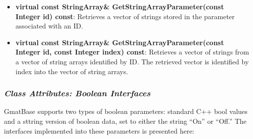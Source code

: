 \begin{itemize}
{Integer index) const}: Retrieves a vector of strings from a vector of string arrays identified by
a text label.  The retrieved vector is identified by index into the vector of string arrays.
\item \textbf{virtual const StringArray\& GetStringArrayParameter(const Integer id) const}:
Retrieves a vector of strings stored in the parameter associated with an ID.
\item \textbf{virtual const StringArray\& GetStringArrayParameter(const Integer id, const Integer
index) const}: Retrieves a vector of strings from a vector of string arrays identified by ID.  The
retrieved vector is identified by index into the vector of string arrays.
\end{itemize}

\subsubsection{\textit{Class Attributes: Boolean Interfaces}}

GmatBase supports two types of boolean parameters: standard C++ bool values and a sttring version
of boolean data, set to either the string ``On'' or ``Off.''  The interfaces implemented into these
parameters is presented here:

